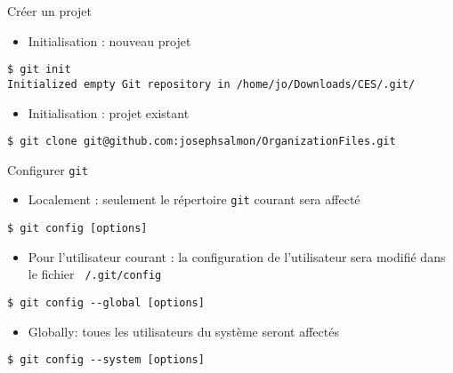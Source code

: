 \documentclass[unknownkeysallowed]{beamer}
\begin{document}
\begin{frame}[fragile]{Créer un projet}

\begin{itemize}
  \item Initialisation : nouveau projet
\end{itemize}
\begin{lstlisting}
$ git init
Initialized empty Git repository in /home/jo/Downloads/CES/.git/
\end{lstlisting}

\begin{itemize}
  \item Initialisation : projet existant
\end{itemize}

\begin{lstlisting}
$ git clone git@github.com:josephsalmon/OrganizationFiles.git
\end{lstlisting}

\end{frame}



\begin{frame}[fragile]{Configurer \texttt{git}}

\begin{itemize}
  \item Localement : seulement le répertoire \texttt{git} courant sera affecté
\end{itemize}
\begin{lstlisting}
$ git config [options]
\end{lstlisting}

\begin{itemize}
  \item Pour l'utilisateur courant : la configuration de l'utilisateur sera modifié dans le fichier \texttt{~/.git/config}
\end{itemize}

\begin{lstlisting}
$ git config --global [options]
\end{lstlisting}


\begin{itemize}
  \item Globally: toues les utilisateurs du système seront affectés
\end{itemize}

\begin{lstlisting}
$ git config --system [options]
\end{lstlisting}


\end{frame}
\end{document}
